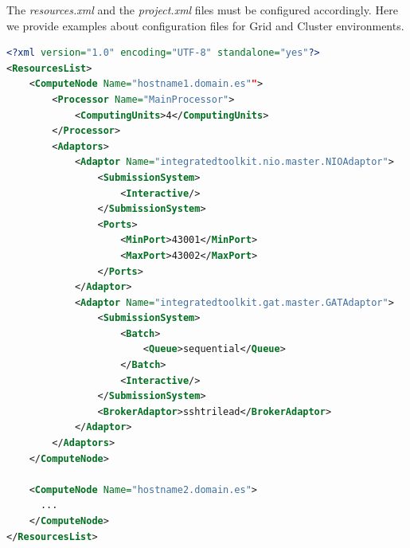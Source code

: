 The \textit{resources.xml} and the \textit{project.xml} files must be configured accordingly.
Here we provide examples about configuration files for Grid and Cluster environments.

\begin{lstlisting}[language=xml]
<?xml version="1.0" encoding="UTF-8" standalone="yes"?>                                                                                                                                                            
<ResourcesList>                                                                                                                                                                                                    
    <ComputeNode Name="hostname1.domain.es"">                                                                                                                                                                       
        <Processor Name="MainProcessor">                                                                                                                                                                           
            <ComputingUnits>4</ComputingUnits>                                                                                                                                                                     
        </Processor>                                                                                                                                                                                               
        <Adaptors>                                                                                                                                                                                                 
            <Adaptor Name="integratedtoolkit.nio.master.NIOAdaptor">                                                                                                                                               
                <SubmissionSystem>
                    <Interactive/>
                </SubmissionSystem>
                <Ports>
                    <MinPort>43001</MinPort>
                    <MaxPort>43002</MaxPort>
                </Ports>
            </Adaptor>
            <Adaptor Name="integratedtoolkit.gat.master.GATAdaptor">
                <SubmissionSystem>
                    <Batch>
                        <Queue>sequential</Queue>
                    </Batch>
                    <Interactive/>
                </SubmissionSystem>
                <BrokerAdaptor>sshtrilead</BrokerAdaptor>
            </Adaptor>
        </Adaptors>
    </ComputeNode>
    
    <ComputeNode Name="hostname2.domain.es">
      ...
    </ComputeNode>
</ResourcesList>
\end{lstlisting}

